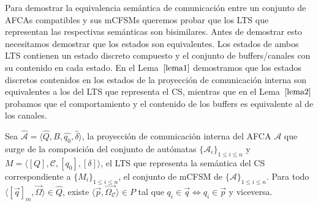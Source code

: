 Para demostrar la equivalencia semántica de comunicación entre un conjunto de AFCAs compatibles y sus mCFSMs queremos probar que los LTS que representan las respectivas semánticas son bisimilares. Antes de demostrar esto necesitamos demostrar que los estados son equivalentes. Los estados de ambos LTS contienen un estado discreto compuesto y el conjunto de buffers/canales con su contenido en cada estado. En el Lema~$\ref{lema1}$ demostramos que los estados discretos contenidos en los estados de la proyección de comunicación interna son equivalentes a los del LTS que representa el CS, mientras que en el Lema~$\ref{lema2}$ probamos que el comportamiento y el contenido de los buffers es equivalente al de los canales. 

\begin{lemma}
\label{lema1} 
Sea $\widehat{\mathcal{A}}=\langle \widehat{Q}, B, \widehat{q_0}, \widehat{\delta} \rangle$, la proyección de comunicación interna del AFCA $\mathcal{A}$ que surge de la composición del conjunto de autómatas  $\{\mathcal{A}_i\}_{1 \leq i \leq n}$  y $M= \langle [Q], \mathcal{C}, [q_0], [\delta] \rangle$, el LTS que representa la semántica del CS correspondiente a $\{M_i\}_{1 \leq i \leq n}$, el conjunto de mCFSM de $\{\mathcal{A}\}_{1 \leq i \leq n}$. Para todo $\langle [\overrightarrow{q}]_m, \overrightarrow{\Omega} \rangle \in \widehat{Q}$, existe $\langle \overrightarrow{p}, \overrightarrow{\Omega_{\mathcal{C}}} \rangle \in P$ tal que $q_i \in \overrightarrow{q} \iff q_i \in \overrightarrow{p}$ y viceversa. 
\end{lemma}
